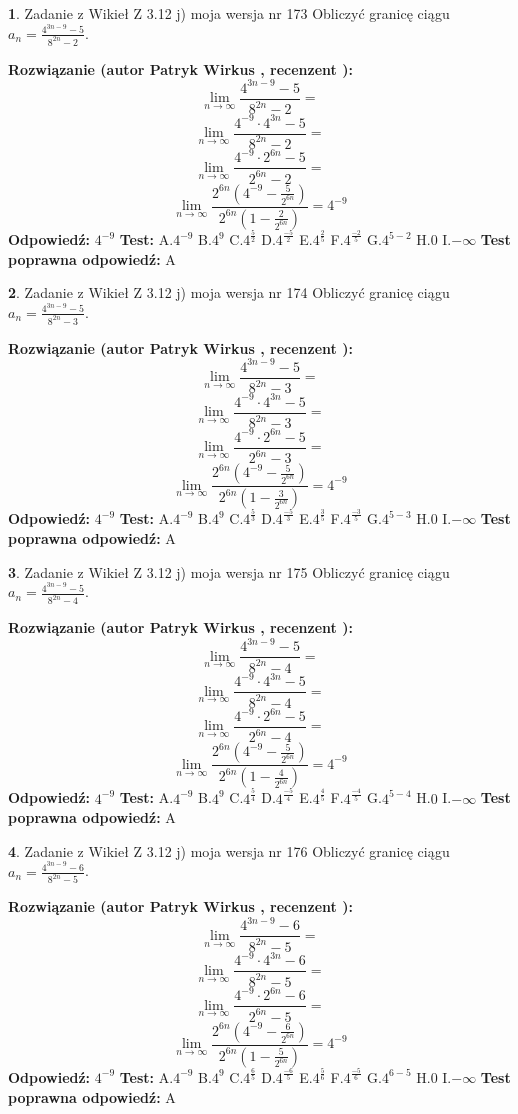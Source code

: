 \documentclass[12pt, a4paper]{article}
\theoremstyle{definition} %
\newtheorem{zad}{}
\newcommand{\zadStart}[1]{\begin{zad}#1\newline}
\newcommand{\zadStop}{\end{zad}}
\newcommand{\rozwStart}[2]{\noindent \textbf{Rozwiązanie (autor #1 , recenzent #2): }\newline}
\newcommand{\rozwStop}{\newline}
\newcommand{\odpStart}{\noindent \textbf{Odpowiedź:}\newline}
\newcommand{\odpStop}{\newline}
\newcommand{\testStart}{\noindent \textbf{Test:}\newline}
\newcommand{\testStop}{\newline}
\newcommand{\kluczStart}{\noindent \textbf{Test poprawna odpowiedź:}\newline}
\newcommand{\kluczStop}{\newline}
\begin{document}
\zadStart{Zadanie z Wikieł Z 3.12 j) moja wersja nr 173}
Obliczyć granicę ciągu $a_{n}=\frac{4^{3n-9}-5}{8^{2n}-2}$.
\zadStop
\rozwStart{Patryk Wirkus}{}
$$\lim\limits_{n\to\infty}\frac{4^{3n-9}-5}{8^{2n}-2}=$$
$$\lim\limits_{n\to\infty}\frac{4^{-9} \cdot 4^{3n}-5}{8^{2n}-2}=$$
$$\lim\limits_{n\to\infty}\frac{4^{-9} \cdot 2^{6n}-5}{2^{6n}-2}=$$
$$\lim\limits_{n\to\infty}\frac{2^{6n}(4^{-9} - \frac{5}{2^{6n}})}{2^{6n}(1-\frac{2}{2^{6n}})}= 4^{-9}$$
\rozwStop
\odpStart
$4^{-9}$
\odpStop
\testStart
A.$4^{-9}$
B.$4^{9}$
C.$4^{\frac{5}{2}}$
D.$4^{\frac{-5}{2}}$
E.$4^{\frac{2}{5}}$
F.$4^{\frac{-2}{5}}$
G.$4^{5-2}$
H.$0$
I.$-\infty$
\testStop
\kluczStart
A
\kluczStop



\zadStart{Zadanie z Wikieł Z 3.12 j) moja wersja nr 174}
Obliczyć granicę ciągu $a_{n}=\frac{4^{3n-9}-5}{8^{2n}-3}$.
\zadStop
\rozwStart{Patryk Wirkus}{}
$$\lim\limits_{n\to\infty}\frac{4^{3n-9}-5}{8^{2n}-3}=$$
$$\lim\limits_{n\to\infty}\frac{4^{-9} \cdot 4^{3n}-5}{8^{2n}-3}=$$
$$\lim\limits_{n\to\infty}\frac{4^{-9} \cdot 2^{6n}-5}{2^{6n}-3}=$$
$$\lim\limits_{n\to\infty}\frac{2^{6n}(4^{-9} - \frac{5}{2^{6n}})}{2^{6n}(1-\frac{3}{2^{6n}})}= 4^{-9}$$
\rozwStop
\odpStart
$4^{-9}$
\odpStop
\testStart
A.$4^{-9}$
B.$4^{9}$
C.$4^{\frac{5}{3}}$
D.$4^{\frac{-5}{3}}$
E.$4^{\frac{3}{5}}$
F.$4^{\frac{-3}{5}}$
G.$4^{5-3}$
H.$0$
I.$-\infty$
\testStop
\kluczStart
A
\kluczStop



\zadStart{Zadanie z Wikieł Z 3.12 j) moja wersja nr 175}
Obliczyć granicę ciągu $a_{n}=\frac{4^{3n-9}-5}{8^{2n}-4}$.
\zadStop
\rozwStart{Patryk Wirkus}{}
$$\lim\limits_{n\to\infty}\frac{4^{3n-9}-5}{8^{2n}-4}=$$
$$\lim\limits_{n\to\infty}\frac{4^{-9} \cdot 4^{3n}-5}{8^{2n}-4}=$$
$$\lim\limits_{n\to\infty}\frac{4^{-9} \cdot 2^{6n}-5}{2^{6n}-4}=$$
$$\lim\limits_{n\to\infty}\frac{2^{6n}(4^{-9} - \frac{5}{2^{6n}})}{2^{6n}(1-\frac{4}{2^{6n}})}= 4^{-9}$$
\rozwStop
\odpStart
$4^{-9}$
\odpStop
\testStart
A.$4^{-9}$
B.$4^{9}$
C.$4^{\frac{5}{4}}$
D.$4^{\frac{-5}{4}}$
E.$4^{\frac{4}{5}}$
F.$4^{\frac{-4}{5}}$
G.$4^{5-4}$
H.$0$
I.$-\infty$
\testStop
\kluczStart
A
\kluczStop



\zadStart{Zadanie z Wikieł Z 3.12 j) moja wersja nr 176}
Obliczyć granicę ciągu $a_{n}=\frac{4^{3n-9}-6}{8^{2n}-5}$.
\zadStop
\rozwStart{Patryk Wirkus}{}
$$\lim\limits_{n\to\infty}\frac{4^{3n-9}-6}{8^{2n}-5}=$$
$$\lim\limits_{n\to\infty}\frac{4^{-9} \cdot 4^{3n}-6}{8^{2n}-5}=$$
$$\lim\limits_{n\to\infty}\frac{4^{-9} \cdot 2^{6n}-6}{2^{6n}-5}=$$
$$\lim\limits_{n\to\infty}\frac{2^{6n}(4^{-9} - \frac{6}{2^{6n}})}{2^{6n}(1-\frac{5}{2^{6n}})}= 4^{-9}$$
\rozwStop
\odpStart
$4^{-9}$
\odpStop
\testStart
A.$4^{-9}$
B.$4^{9}$
C.$4^{\frac{6}{5}}$
D.$4^{\frac{-6}{5}}$
E.$4^{\frac{5}{6}}$
F.$4^{\frac{-5}{6}}$
G.$4^{6-5}$
H.$0$
I.$-\infty$
\testStop
\kluczStart
A
\kluczStop
\end{document}
